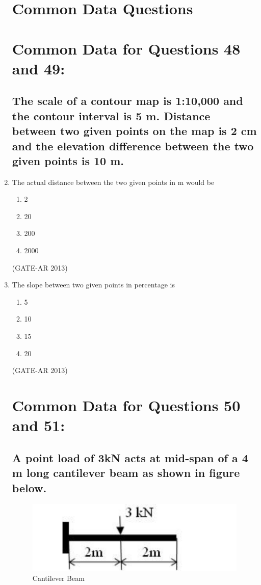 \documentclass[a4paper,10pt]{article}
\begin{document}
\begin{enumerate}
\section*{Common Data Questions}
\section*{Common Data for Questions 48 and 49:}
\subsection*{The scale of a contour map is 1:10,000 and the contour interval is 5 m. Distance between two given points on the map is 2 cm and the elevation difference between the two given points is 10 m.}

    \item The actual distance between the two given points in m would be
    \begin{multicols}{4}
	\begin{enumerate}
        \item 2
        \item 20
        \item 200
        \item 2000
    \end{enumerate}
	\end{multicols}
    \hfill (GATE-AR 2013)

    \item The slope between two given points in percentage is
    \begin{multicols}{4}
	\begin{enumerate}
        \item 5
        \item 10
        \item 15
        \item 20
    \end{enumerate}
	\end{multicols}
    \hfill (GATE-AR 2013)

\section*{Common Data for Questions 50 and 51:}
\subsection*{A point load of 3kN acts at mid-span of a 4 m long cantilever beam as shown in figure below.}
	\begin{figure}[h!]
    \centering
    \includegraphics[width=0.5\linewidth]{figs/03.jpg}
    \caption{Cantilever Beam}
    \label{fig:Img03}
    \end{figure}
    

\end{enumerate}
\end{document}
